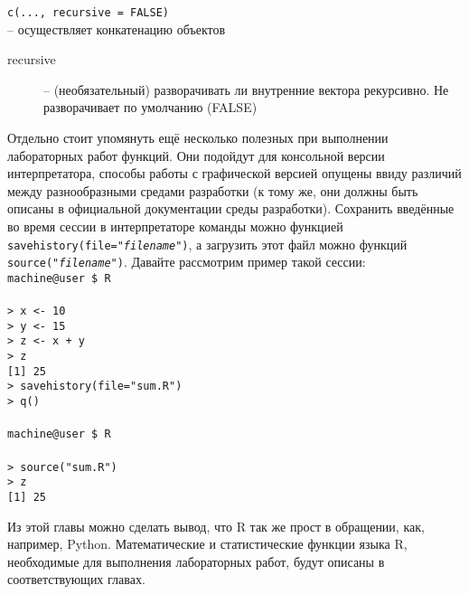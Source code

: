     \begin{mdframed}[style=BadassFrame]
        \texttt{c(..., recursive = FALSE)} \\
        -- осуществляет конкатенацию объектов
        \begin{description}
            \item[recursive] -- (необязательный) разворачивать ли внутренние 
                вектора рекурсивно. Не разворачивает по умолчанию (FALSE)
        \end{description}
    \end{mdframed}

    Отдельно стоит упомянуть ещё несколько полезных при выполнении лабораторных работ 
    функций. Они подойдут для консольной версии интерпретатора, способы работы с графической
    версией опущены ввиду различий между разнообразными средами разработки (к тому же, они
    должны быть описаны в официальной документации среды разработки). Сохранить введённые во 
    время сессии в интерпретаторе команды можно функцией 
    \texttt{savehistory(file="\textit{filename}")}, а загрузить этот файл можно 
    функций \texttt{source("\textit{filename}")}. Давайте рассмотрим пример такой 
    сессии: \\
    \indent\texttt{machine@user \$ R} \\ \\
    \indent\texttt{> x <- 10} \\
    \indent\texttt{> y <- 15} \\
    \indent\texttt{> z <- x + y} \\
    \indent\texttt{> z} \\
    \indent\texttt{[1] 25} \\
    \indent\texttt{> savehistory(file="sum.R")} \\
    \indent\texttt{> q()} \\ \\
    \indent\texttt{machine@user \$ R} \\ \\
    \indent\texttt{> source("sum.R")} \\
    \indent\texttt{> z} \\
    \indent\texttt{[1] 25}

    \indent Из этой главы можно сделать вывод, что R так же прост в обращении, как, например, 
    Python. Математические и статистические функции языка R, необходимые для выполнения 
    лабораторных работ, будут описаны в соответствующих главах.
